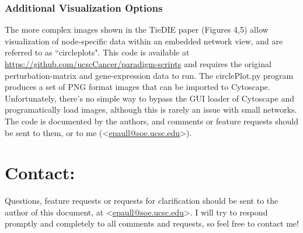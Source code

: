 \documentclass[11pt]{report}
\newcommand{\emailaddr}[1]{\textless\url{#1}\textgreater}
\begin{document}
\clearpage

\subsection{Additional Visualization Options}

The more complex images shown in the TieDIE paper (Figures 4,5) allow visualization of node-specific data within an embedded network view, 
and are referred to as ``circleplots". 
This code is available at \url{https://github.com/ucscCancer/paradigm-scripts} and requires the original perturbation-matrix and gene-expression data to run. The circlePlot.py program produces a set of PNG format images that can be imported to Cytoscape. Unfortunately, there's no simple way to bypass the GUI loader of Cytoscape and programatically load images, although this is rarely an issue with small networks. The code is documented by the authors, and comments or feature requests should be sent to them, or to me (\emailaddr{epaull@soe.ucsc.edu}). 

\chapter{Contact:}

Questions, feature requests or requests for clarification should be sent to the author of this document, at \emailaddr{epaull@soe.ucsc.edu}. I will try to respond promptly and completely to all comments and requests, so feel free to contact me!
 

\end{document}
